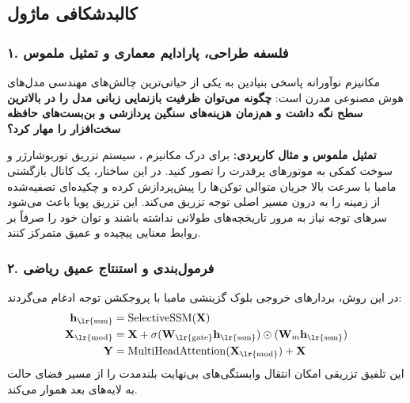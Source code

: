 \subsection{کالبدشکافی ماژول }

\subsubsection*{۱. فلسفه طراحی، پارادایم معماری و تمثیل ملموس}
مکانیزم نوآورانه  پاسخی بنیادین به یکی از حیاتی‌ترین چالش‌های مهندسی مدل‌های هوش مصنوعی مدرن است: \textbf{چگونه می‌توان ظرفیت بازنمایی زبانی مدل را در بالاترین سطح نگه داشت و هم‌زمان هزینه‌های سنگین پردازشی و بن‌بست‌های حافظه سخت‌افزار را مهار کرد؟}

\textbf{تمثیل ملموس و مثال کاربردی:}
برای درک مکانیزم ، سیستم تزریق توربوشارژر و سوخت کمکی به موتورهای پرقدرت را تصور کنید. در این ساختار، یک کانال بازگشتی مامبا با سرعت بالا جریان متوالی توکن‌ها را پیش‌پردازش کرده و چکیده‌ای تصفیه‌شده از زمینه را به درون مسیر اصلی توجه تزریق می‌کند. این تزریق پویا باعث می‌شود سرهای توجه نیاز به مرور تاریخچه‌های طولانی نداشته باشند و توان خود را صرفاً بر روابط معنایی پیچیده و عمیق متمرکز کنند.

\subsubsection*{۲. فرمول‌بندی و استنتاج عمیق ریاضی }
در این روش، بردارهای خروجی بلوک گزینشی مامبا با پروجکشن توجه ادغام می‌گردند:
\begin{align}
\mathbf{h}_{\text{\lr{ssm}}} &= \operatorname{SelectiveSSM}(\mathbf{X}) \\
\mathbf{X}_{\text{\lr{mod}}} &= \mathbf{X} + \sigma(\mathbf{W}_{\text{\lr{gate}}} \mathbf{h}_{\text{\lr{ssm}}}) \odot (\mathbf{W}_m \mathbf{h}_{\text{\lr{ssm}}}) \\
\mathbf{Y} &= \operatorname{MultiHeadAttention}(\mathbf{X}_{\text{\lr{mod}}}) + \mathbf{X}
\end{align}
این تلفیق تزریقی امکان انتقال وابستگی‌های بی‌نهایت بلندمدت را از مسیر فضای حالت به لایه‌های بعد هموار می‌کند.


